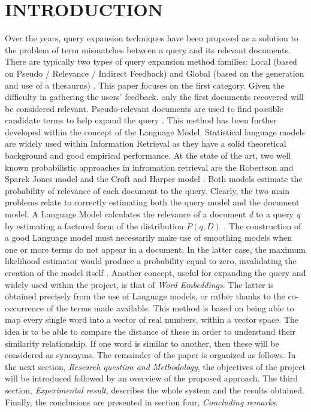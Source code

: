 \section*{INTRODUCTION}
Over the years, query expansion techniques have been proposed as a solution 
to the problem of term mismatches between a query and its relevant documents. 
There are typically two types of query expansion method families: 
Local (based on Pseudo / Relevance / Indirect Feedback) and Global (based 
on the generation and use of a thesaurus) \cite{01}. This paper focuses on the 
first category. Given the difficulty in gathering the users' feedback, only the 
first documents recovered will be considered relevant. Pseudo-relevant documents 
are used to find possible candidate terms to help expand the query \cite{02}.
This method has been further developed within the concept of the Language
Model\cite{06}. Statistical language models are widely used within Information 
Retrieval as they have a solid theoretical background and good empirical performance. 
At the state of the art, two well known probabilistic approaches 
in infromation retrieval are the Robertson and Sparck Jones model \cite{07} and 
the Croft and Harper model \cite{08}. Both models estimate the probability of relevance 
of each document to the query. Clearly, the two main problems relate 
to correctly estimating both the query model and the document model. A 
Language Model calculates the relevance of a document \emph{d} to a query \emph{q} by 
estimating a factored form of the distribution $P (q, D)$ \cite{03}. The construction 
of a good Language model must necessarily make use of smoothing models 
when one or more terms do not appear in a document. In the latter case, the 
maximum likelihood estimator would produce a probability equal to zero, 
invalidating the creation of the model itself \cite{04}\cite{05}. Another concept, useful 
for expanding the query and widely used within the project, is that of 
\emph{Word Embeddings}. The latter is obtained precisely from the use of Language 
models, or rather thanks to the co-occurrence of the terms made available. 
This method is based on being able to map every single word into a vector of 
real numbers, within a vector space. The idea is to be able to compare the 
distance of these in order to understand their similarity relationship. If one 
word is similar to another, then these will be considered as synonyms. The 
remainder of the paper is organized as follows. In the next section, \emph{Research 
question and Methodology}, the objectives of the project will be introduced 
followed by an overview of the proposed approach. The third section, \emph{Experimental 
result}, describes the whole system and the results obtained. Finally, 
the conclusions are presented in section four, \emph{Concluding remarks}.